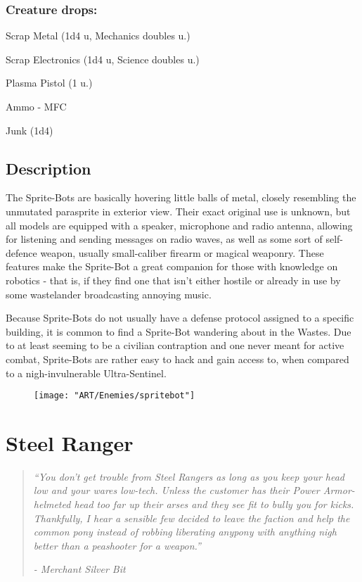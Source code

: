 \documentclass[11pt,a4paper,twocolumn]{book}
\begin{document}
	\subsubsection*{Creature drops:}
	\begin{compactitem}
		\item Scrap Metal (1d4 u, Mechanics doubles u.)
		\item Scrap Electronics (1d4 u, Science doubles u.)
		\item Plasma Pistol (1 u.)
		\item Ammo - MFC
		\item Junk (1d4)
	\end{compactitem}
	
	\subsection*{Description}
	The Sprite-Bots are basically hovering little balls of metal, closely resembling the unmutated parasprite in exterior view. Their exact original use is unknown, but all models are equipped with a speaker, microphone and radio antenna, allowing for listening and sending messages on radio waves, as well as some sort of self-defence weapon, usually small-caliber firearm or magical weaponry. These features make the Sprite-Bot a great companion for those with knowledge on robotics - that is, if they find one that isn't either hostile or already in use by some wastelander broadcasting annoying music.
	
	Because Sprite-Bots do not usually have a defense protocol assigned to a specific building, it is common to find a Sprite-Bot wandering about in the Wastes. Due to at least seeming to be a civilian contraption and one never meant for active combat, Sprite-Bots are rather easy to hack and gain access to, when compared to a nigh-invulnerable Ultra-Sentinel.
	
	\begin{figure}[h]
		\centering
		\texttt{[image: "ART/Enemies/spritebot"]}
	\end{figure}
	
	\clearpage
	
	\section*{Steel Ranger}
	\begin{quote}
		\emph{``You don't get trouble from Steel Rangers as long as you keep your head low and your wares low-tech. Unless the customer has their Power Armor-helmeted head too far up their arses and they see fit to bully you for kicks. Thankfully, I hear a sensible few decided to leave the faction and help the common pony instead of robbing liberating anypony with anything nigh better than a peashooter for a weapon.''}    
		
		\emph{-	Merchant Silver Bit }
	\end{quote}
	
\end{document}
